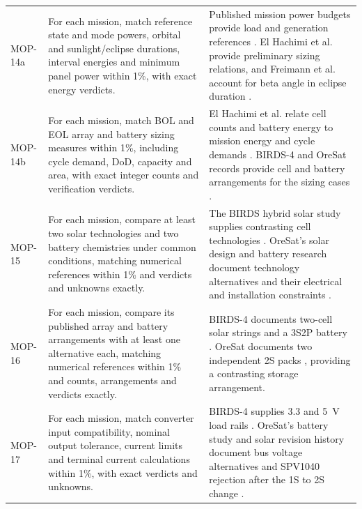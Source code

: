 \begin{longtable}{@{}P{0.13\ReportTableBodyWidth}P{0.45\ReportTableBodyWidth}P{0.42\ReportTableBodyWidth}@{}}
\addlinespace[3pt]
MOP-14a & For each mission, match reference state and mode powers, orbital and sunlight/eclipse durations, interval energies and minimum panel power within 1\%, with exact energy verdicts. & Published mission power budgets provide load and generation references \citep{shrestha2022birds4powerbudget,oresat2019powerbudget}. El Hachimi et al. provide preliminary sizing relations, and Freimann et al. account for beta angle in eclipse duration \citep{handpicked-0003,review-1231}. \\
\addlinespace[3pt]
MOP-14b & For each mission, match BOL and EOL array and battery sizing measures within 1\%, including cycle demand, DoD, capacity and area, with exact integer counts and verification verdicts. & El Hachimi et al. relate cell counts and battery energy to mission energy and cycle demands \citep[Secs.~3 and~6.2]{handpicked-0003}. BIRDS-4 and OreSat records provide cell and battery arrangements for the sizing cases \citep{shrestha2021birdssafety,greenberg2021oresat}. \\
\addlinespace[3pt]
MOP-15 & For each mission, compare at least two solar technologies and two battery chemistries under common conditions, matching numerical references within 1\% and verdicts and unknowns exactly. & The BIRDS hybrid solar study supplies contrasting cell technologies \citep[Sec.~III]{shrestha2026solarreliability}. OreSat's solar design and battery research document technology alternatives and their electrical and installation constraints \citep{oresat2025solardesign,oresatbatteryresearch}. \\
\addlinespace[3pt]
MOP-16 & For each mission, compare its published array and battery arrangements with at least one alternative each, matching numerical references within 1\% and counts, arrangements and verdicts exactly. & BIRDS-4 documents two-cell solar strings and a 3S2P battery \citep[Sec.~2.2, Table~5]{shrestha2021birdssafety}. OreSat documents two independent 2S packs \citep[p.~6]{greenberg2021oresat}, providing a contrasting storage arrangement. \\
\addlinespace[3pt]
MOP-17 & For each mission, match converter input compatibility, nominal output tolerance, current limits and terminal current calculations within 1\%, with exact verdicts and unknowns. & BIRDS-4 supplies 3.3 and 5~V load rails \citep[Sec.~2.2.3]{shrestha2021birdssafety}. OreSat's battery study and solar revision history document bus voltage alternatives and SPV1040 rejection after the 1S to 2S change \citep{oresatbatteryresearch,oresatsolarhistory}. \\

\end{longtable}

